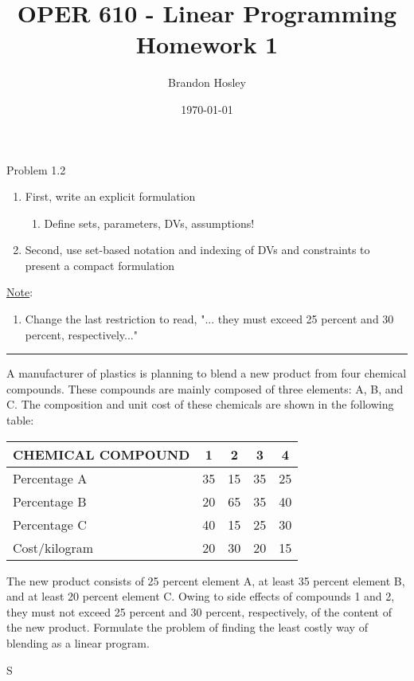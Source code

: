 \documentclass[answers]{exam}
\title{OPER 610 - Linear Programming%
	\\ Homework 1}
\author{Brandon Hosley}
\date{\today}
\begin{document}
\maketitle
\begin{questions}

\question 
Problem 1.2
\begin{enumerate}
	\item First, write an explicit formulation
	\begin{enumerate}
		\item Define sets, parameters, DVs, assumptions!
	\end{enumerate}
\item Second, use set-based notation and indexing of DVs and constraints to present a compact formulation
\end{enumerate}
\underline{Note}:
\begin{enumerate}
	\item Change the last restriction to read, "... they must exceed 25 percent and 30 percent, respectively..."
\end{enumerate}
\hrule
A manufacturer of plastics is planning to blend a new product from four chemical compounds. These compounds are mainly composed of three elements: A, B, and C. The composition and unit cost of these chemicals are shown in the following table:
\begin{tabular}{lcccc}
	\toprule
	CHEMICAL COMPOUND & 1 & 2 & 3 & 4 \\
	\midrule
	Percentage A  & 35 & 15 & 35 & 25 \\
	Percentage B  & 20 & 65 & 35 & 40 \\
	Percentage C  & 40 & 15 & 25 & 30 \\
	Cost/kilogram & 20 & 30 & 20 & 15 \\
	\bottomrule 
\end{tabular}
The new product consists of 25 percent element A, at least 35 percent element B, and at least 20 percent element C. Owing to side effects of compounds 1 and 2, they must not exceed 25 percent and 30 percent, respectively, of the content of the new product. Formulate the problem of finding the least costly way of blending as a linear program.
\begin{solution}
	S
\end{solution}
\end{questions}
\end{document}
